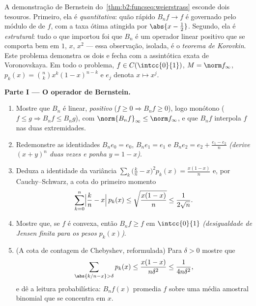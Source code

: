 \begin{problem}\label{pb:b2:funcseq:1}
A demonstração de Bernstein do~\cref{thm:b2:funcseq:weierstrass} esconde
dois tesouros. Primeiro, ela é \emph{quantitativa}: quão rápido $B_nf
\to f$ é governado pelo módulo de  de $f$, com a
taxa ótima atingida por $\abs{x - \frac12}$. Segundo, ela é
\emph{estrutural}: tudo o que importou foi que $B_n$ é um
operador linear positivo que se comporta bem em $1$, $x$, $x^2$ ---
essa observação, isolada, é o \emph{teorema de
Korovkin}. Este problema demonstra os dois
e fecha com a assintótica exata de Voronovskaya. Em todo o problema,
$f \in C(\intcc{0}{1})$, $M = \norm f_\infty$, $p_k(x) = \binom
nk x^k(1-x)^{n-k}$ e $e_j$ denota $x \mapsto x^j$.

\medskip
\noindent\textbf{Parte I --- O operador de Bernstein.}
\begin{enumerate}
  \item Mostre que $B_n$ é linear, \emph{positivo} ($f \geq 0
        \Rightarrow B_nf \geq 0$), logo monótono ($f \leq g
        \Rightarrow B_nf \leq B_ng$), com
        $\norm{B_nf}_\infty \leq \norm f_\infty$, e que
        $B_nf$ interpola $f$ nas duas extremidades.
  \item Redemonstre as identidades $B_n e_0 = e_0$, $B_n e_1 =
        e_1$ e $B_n e_2 = e_2 + \frac{e_1 - e_2}{n}$
        \emph{(derive $(x + y)^n$ duas vezes e ponha $y = 1 -
        x$)}.
  \item Deduza a identidade da variância $\sum_k \bigl(\frac kn -
        x\bigr)^2 p_k(x) = \frac{x(1-x)}{n}$ e, por
        Cauchy--Schwarz, a cota do primeiro momento
        \[
        \sum_{k=0}^{n}\Bigl|\frac kn - x\Bigr|\,p_k(x)
        \leq \sqrt{\frac{x(1-x)}{n}} \leq \frac{1}{2\sqrt n} .
        \]
  \item Mostre que, se $f$ é convexa, então $B_nf \geq f$ em
        $\intcc{0}{1}$ \emph{(desigualdade de Jensen finita para os
        pesos $p_k(x)$)}.
  \item (A cota de contagem de Chebyshev, reformulada) Para $\delta > 0$
        mostre que
        \[
        \sum_{\abs{k/n - x} > \delta} p_k(x)
        \leq \frac{x(1-x)}{n\delta^2}
        \leq \frac{1}{4n\delta^2} ,
        \]
        e dê a leitura probabilística: $B_nf(x)$ promedia
        $f$ sobre uma média amostral binomial que se concentra em $x$.
\end{enumerate}


\end{problem}
